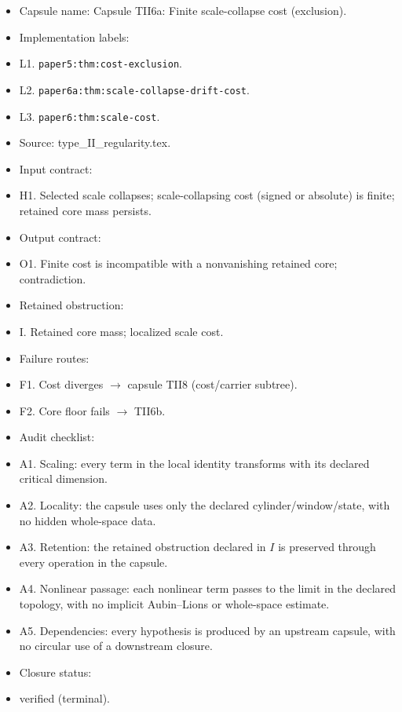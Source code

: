 \documentclass[11pt]{amsart}
\begin{document}
\begin{itemize}
  \item Capsule name: Capsule TII6a: Finite scale-collapse cost (exclusion).
  \item Implementation labels:
  \item L1. \texttt{paper5:thm:cost-exclusion}.
  \item L2. \texttt{paper6a:thm:scale-collapse-drift-cost}.
  \item L3. \texttt{paper6:thm:scale-cost}.
  \item Source: type\_II\_regularity.tex.
  \item Input contract:
  \item H1. Selected scale collapses; scale-collapsing cost (signed or absolute) is finite; retained core mass persists.
  \item Output contract:
  \item O1. Finite cost is incompatible with a nonvanishing retained core; contradiction.
  \item Retained obstruction:
  \item I. Retained core mass; localized scale cost.
  \item Failure routes:
  \item F1. Cost diverges $\to$ capsule TII8 (cost/carrier subtree).
  \item F2. Core floor fails $\to$ TII6b.
  \item Audit checklist:
  \item A1. Scaling: every term in the local identity transforms with its declared critical dimension.
  \item A2. Locality: the capsule uses only the declared cylinder/window/state, with no hidden whole-space data.
  \item A3. Retention: the retained obstruction declared in $I$ is preserved through every operation in the capsule.
  \item A4. Nonlinear passage: each nonlinear term passes to the limit in the declared topology, with no implicit Aubin--Lions or whole-space estimate.
  \item A5. Dependencies: every hypothesis is produced by an upstream capsule, with no circular use of a downstream closure.
  \item Closure status:
  \item verified (terminal).
\end{itemize}
\end{document}
